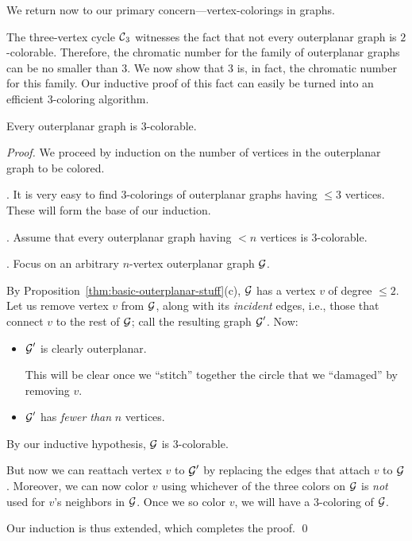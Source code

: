 \medskip

We return now to our primary concern---vertex-colorings in graphs.

\medskip

The three-vertex cycle $\mbox{$\cal C$}_3$ witnesses the fact that not every outerplanar graph is $2$-colorable. Therefore, the chromatic number for the family of outerplanar graphs can be no smaller than $3$.  We now show that $3$ is, in fact, the chromatic number for this family.  Our inductive proof of this fact can easily be turned into an efficient $3$-coloring algorithm.

\begin{prop}
\label{thm:OP-3-colorability}
Every outerplanar graph is $3$-colorable.
\end{prop}

\begin{proof}
We proceed by induction on the number of vertices in the outerplanar graph to be colored.

\smallskip

.
It is very easy to find $3$-colorings of outerplanar graphs having $\leq 3$ vertices.  These will form the base of our induction.

\medskip

.
Assume that every outerplanar graph having $< n$ vertices is $3$-colorable.

\medskip

.
Focus on an arbitrary $n$-vertex outerplanar graph $\mbox{$\cal G$}$.

\smallskip


By Proposition~\ref{thm:basic-outerplanar-stuff}(c), $\mbox{$\cal G$}$ has a vertex $v$ of degree $\leq 2$.  Let us remove vertex $v$ from $\mbox{$\cal G$}$, along with its {\it incident} edges, i.e., those that connect $v$ to the rest of $\mbox{$\cal G$}$; call the resulting graph $\mbox{$\cal G$}'$.  Now: 
\begin{itemize}
\item
$\mbox{$\cal G$}'$ is clearly outerplanar.

\smallskip

This will be clear once we ``stitch'' together the circle that we ``damaged'' by removing $v$.
\medskip\item
$\mbox{$\cal G$}'$ has {\em fewer than} $n$ vertices.
\end{itemize}
By our inductive hypothesis, $\mbox{$\cal G$}$ is $3$-colorable.

\smallskip

But now we can reattach vertex $v$ to $\mbox{$\cal G$}'$ by replacing the edges that attach $v$ to $\mbox{$\cal G$}$. Moreover, we can now color $v$ using whichever of the three colors on $\mbox{$\cal G$}$ is {\em not} used for $v$'s neighbors in $\mbox{$\cal G$}$.  Once we so color $v$, we will have a $3$-coloring of $\mbox{$\cal G$}$.

\smallskip

Our induction is thus extended, which completes the proof.  \qed
\end{proof}


